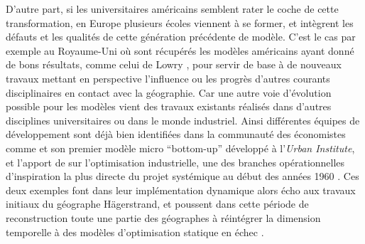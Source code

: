D'autre part, si les universitaires américains semblent rater le coche de cette transformation, en Europe plusieurs écoles viennent à se former, et intègrent les défauts et les qualités de cette génération précédente de modèle. C'est le cas par exemple au Royaume-Uni où sont récupérés les modèles américains ayant donné de bons résultats, comme celui de Lowry \autocite{Lowry1964}, pour servir de base à de nouveaux travaux mettant en perspective l'influence ou les progrès d'autres courants disciplinaires en contact avec la géographie. Car une autre voie d'évolution possible pour les modèles vient des travaux existants réalisés dans d'autres disciplines universitaires ou dans le monde industriel. Ainsi différentes équipes de développement sont déjà bien identifiées dans la communauté des économistes comme \textcite{Orcutt1957} et son premier modèle micro \foreignquote{english}{bottom-up} développé à l'\textit{Urban Institute}, et l'apport de \textcite{Forrester1961,Forrester1969} sur l'optimisation industrielle, une des branches opérationnelles d'inspiration la plus directe du projet systémique au début des années 1960 \autocites{Cohen1961}[911]{Shubik1960b}. Ces deux exemples font dans leur implémentation dynamique alors écho aux travaux initiaux du géographe Hägerstrand, et poussent dans cette période de reconstruction toute une partie des géographes à réintégrer la dimension temporelle à des modèles d'optimisation statique en échec \autocite[p295]{Batty1976}.


\bigskip

